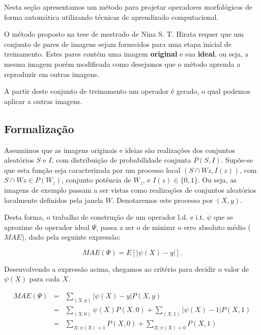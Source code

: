 \documentclass[a4paper,11pt]{article}
\begin{document}
Nesta seção apresentamos um método para projetar operadores morfológicos de forma automática utilizando técnicas de aprendizado computacional.

O método proposto na tese de mestrado de Nina S. T. Hirata \cite{Tomita:1996:PrAuMa} requer que um conjunto de pares de imagens sejam fornecidos para uma etapa inicial de treinamento. Estes pares contém uma imagem {\bf original} e sua {\bf ideal}, ou seja, a mesma imagem porém modificada como desejamos que o método aprenda a reproduzir em outras imagens.

A partir deste conjunto de treinamento um operador é gerado, o qual podemos aplicar a outras imagens.

\subsection{Formalização}

Assumimos que as imagens originais e ideias são realizações dos conjuntos aleatórios $S$ e $I$, com distribuição de probabilidade conjunta $P(S,I)$. Supõe-se que esta função seja caracterizada por um processo local $(S \cap Wz, I(z))$, com $S \cap Wz \in P(W_z)$, conjunto potência de $W_z$, e $I(z) \in \{0, 1\}$. Ou seja, as imagens de exemplo passam a ser vistas como realizações de conjuntos aleatórios localmente definidos pela janela $W$. Denotaremos este processo por $(X, y)$.

Desta forma, o trabalho de construção de um operador l.d. e i.t. $\psi$ que se aproxime do operador ideal $\Psi$, passa a ser o de minizar o erro absoluto médio ($MAE$), dado pela seguinte expressão:

\begin{equation}
  MAE(\Psi) = E[|\psi(X) - y|].
\end{equation}

Desenvolvendo a expressão acima, chegamos ao critério para decidir o valor de $\psi(X)$ para cada $X$.

\begin{equation}
\begin{array}{rcl} 
  MAE(\Psi) & =  & \sum\limits_{(X, y)} |\psi(X) - y | P(X,y) \\
  & =  & \sum\limits_{(X, 0)} \psi(X)P(X, 0) + \sum\limits_{(X, 1)} |\psi(X) - 1|P(X, 1) \\
  & = & \sum\limits_{X \colon \psi(X) = 1} P(X, 0) + \sum\limits_{X \colon \psi(X) = 0} P(X, 1)
\end{array}
\end{equation}
\end{document}
